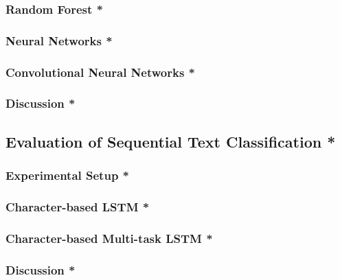 \subsubsection{Random Forest *}
\subsubsection{Neural Networks *}
\subsubsection{Convolutional Neural Networks *}


\subsubsection{Discussion *}


\subsection{Evaluation of Sequential Text Classification *}


\subsubsection{Experimental Setup *}

\subsubsection{Character-based LSTM *}

\subsubsection{Character-based Multi-task LSTM *}

\subsubsection{Discussion *}

